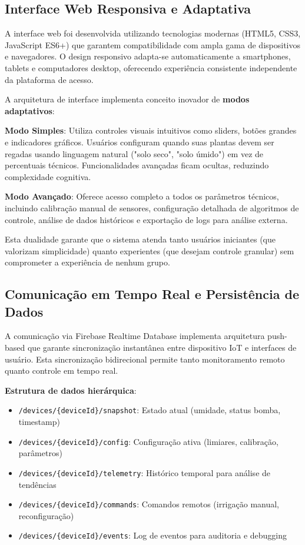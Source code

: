 \subsection{Interface Web Responsiva e Adaptativa}

A interface web foi desenvolvida utilizando tecnologias modernas (HTML5, CSS3, JavaScript ES6+) que garantem compatibilidade com ampla gama de dispositivos e navegadores. O design responsivo adapta-se automaticamente a smartphones, tablets e computadores desktop, oferecendo experiência consistente independente da plataforma de acesso.

A arquitetura de interface implementa conceito inovador de \textbf{modos adaptativos}:

\textbf{Modo Simples}: Utiliza controles visuais intuitivos como sliders, botões grandes e indicadores gráficos. Usuários configuram quando suas plantas devem ser regadas usando linguagem natural ("solo seco", "solo úmido") em vez de percentuais técnicos. Funcionalidades avançadas ficam ocultas, reduzindo complexidade cognitiva.

\textbf{Modo Avançado}: Oferece acesso completo a todos os parâmetros técnicos, incluindo calibração manual de sensores, configuração detalhada de algoritmos de controle, análise de dados históricos e exportação de logs para análise externa.

Esta dualidade garante que o sistema atenda tanto usuários iniciantes (que valorizam simplicidade) quanto experientes (que desejam controle granular) sem comprometer a experiência de nenhum grupo.


\subsection{Comunicação em Tempo Real e Persistência de Dados}

A comunicação via Firebase Realtime Database implementa arquitetura push-based que garante sincronização instantânea entre dispositivo IoT e interfaces de usuário. Esta sincronização bidirecional permite tanto monitoramento remoto quanto controle em tempo real.

\textbf{Estrutura de dados hierárquica}:
\begin{itemize}
\item \texttt{/devices/\{deviceId\}/snapshot}: Estado atual (umidade, status bomba, timestamp)
\item \texttt{/devices/\{deviceId\}/config}: Configuração ativa (limiares, calibração, parâmetros)
\item \texttt{/devices/\{deviceId\}/telemetry}: Histórico temporal para análise de tendências
\item \texttt{/devices/\{deviceId\}/commands}: Comandos remotos (irrigação manual, reconfiguração)
\item \texttt{/devices/\{deviceId\}/events}: Log de eventos para auditoria e debugging
\end{itemize}

